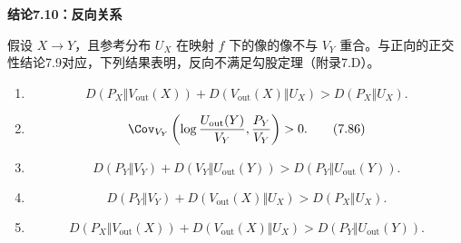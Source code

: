 \par\medskip{}\noindent\textbf{结论7.10：反向关系}\par
假设 $X\to Y$，且参考分布 $U_X$ 在映射 $f$ 下的像的像不与 $V_Y$ 重合。与正向的正交性结论7.9对应，下列结果表明，反向不满足勾股定理（附录7.D）。
\begin{enumerate}
\item
\begin{equation}
D(P_X\Vert V_{\mathrm{out}}(X))+D(V_{\mathrm{out}}(X)\Vert U_X)>D(P_X\Vert U_X).
\tag{7.85}
\end{equation}
\item
\begin{equation}
\Cov_{V_Y}\left(\log\frac{U_{\mathrm{out}}(Y)}{V_Y},\frac{P_Y}{V_Y}\right)>0.
\tag{7.86}
\end{equation}
\item
\begin{equation}
D(P_Y\Vert V_Y)+D(V_Y\Vert U_{\mathrm{out}}(Y))>D(P_Y\Vert U_{\mathrm{out}}(Y)).
\tag{7.87}
\end{equation}
\item
\begin{equation}
D(P_Y\Vert V_Y)+D(V_{\mathrm{out}}(X)\Vert U_X)>D(P_X\Vert U_X).
\tag{7.88}
\end{equation}
\item
\begin{equation}
D(P_X\Vert V_{\mathrm{out}}(X))+D(V_{\mathrm{out}}(X)\Vert U_X)>D(P_Y\Vert U_{\mathrm{out}}(Y)).
\tag{7.89}
\end{equation}
\end{enumerate}

